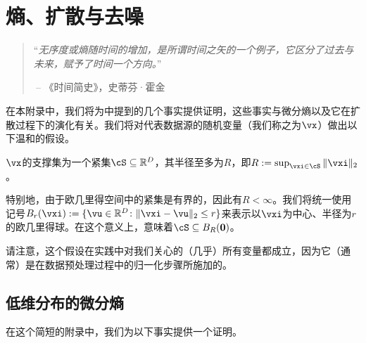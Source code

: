 \documentclass[../../book-main.tex]{subfiles}
\begin{document}
\chapter{熵、扩散与去噪}\label{app:entropy}\label{app:diffusion-denoising}

\begin{quote}
``{\em 无序度或熵随时间的增加，是所谓时间之矢的一个例子，它区分了过去与未来，赋予了时间一个方向。}''

$~$\hfill -- 《时间简史》，史蒂芬·霍金
 \end{quote}
\vspace{5mm}

在本附录中，我们将为中提到的几个事实提供证明，这些事实与微分熵以及它在扩散过程下的演化有关。我们将对代表数据源的随机变量（我们称之为\(\vx\)）做出以下温和的假设。

\begin{assumption}\label{assumption:entropy_x_compact_support}
    \(\vx\)的支撑集为一个紧集\(\cS \subseteq \R^{D}\)，其半径至多为\(R\)，即\(R := \sup_{\vxi \in \cS}\norm{\vxi}_{2}\)。
\end{assumption}

特别地，由于欧几里得空间中的紧集是有界的，因此有\(R < \infty\)。我们将统一使用记号\(B_{r}(\vxi) := \{\vu \in \R^{D} \colon \norm{\vxi - \vu}_{2} \leq r\}\)来表示以\(\vxi\)为中心、半径为\(r\)的欧几里得球。在这个意义上，意味着\(\cS \subseteq B_{R}(\vzero)\)。

请注意，这个假设在实践中对我们关心的（几乎）所有变量都成立，因为它（通常）是在数据预处理过程中的归一化步骤所施加的。

\section{低维分布的微分熵}\label{sec:low_dim_entropy}

在这个简短的附录中，我们为以下事实提供一个证明。
\end{document}
